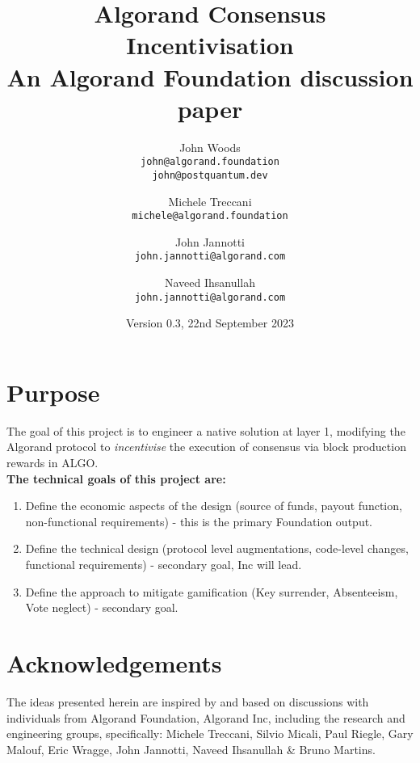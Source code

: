 \documentclass[11pt,a4paper]{article}
\begin{document}
\title {Algorand Consensus Incentivisation \\
       {\large \sc An Algorand Foundation discussion paper}}
\date  {Version 0.3, 22nd September 2023}
\author{
    John Woods \\ 
    {\small \texttt{john@algorand.foundation}} \\
    {\small \texttt{john@postquantum.dev}} \\
\and 
    Michele Treccani \\
    {\small \texttt{michele@algorand.foundation}}
\and 
    John Jannotti \\
    {\small \texttt{john.jannotti@algorand.com}}
\and 
    Naveed Ihsanullah \\
    {\small \texttt{john.jannotti@algorand.com}}
}

\maketitle

\section{Purpose}
The goal of this project is to engineer a native solution at layer 1, modifying the Algorand protocol to 
\emph{incentivise} the execution of consensus via block production rewards in ALGO. \\

\textbf{The technical goals of this project are:}

\begin{enumerate}
    \item Define the economic aspects of the design (source of funds, payout function, non-functional requirements) - 
        this is the primary Foundation output.
    \item Define the technical design (protocol level augmentations, code-level changes, functional requirements) 
        - secondary goal, Inc will lead.
    \item Define the approach to mitigate gamification (Key surrender, Absenteeism, Vote neglect) - secondary goal.
\end{enumerate}

\pagebreak

\tableofcontents

\pagebreak

\section{Acknowledgements}
The ideas presented herein are inspired by and based on discussions with individuals from Algorand Foundation, 
Algorand Inc, including the research and engineering groups, specifically: Michele Treccani, Silvio Micali, Paul Riegle, 
Gary Malouf, Eric Wragge, John Jannotti, Naveed Ihsanullah \& Bruno Martins.
\end{document}
